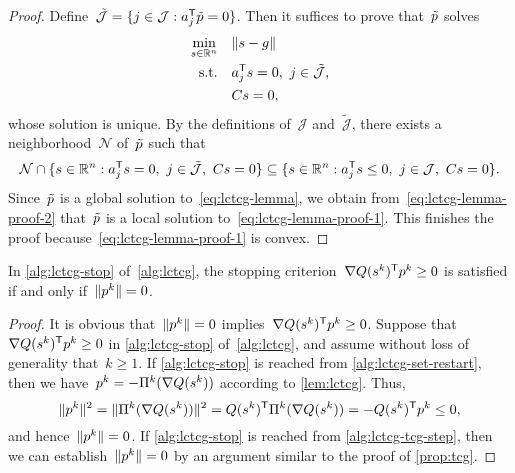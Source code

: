 \begin{proof}
    Define~$\tilde{\mathcal{J}} = \set{j \in \mathcal{J} : a_j^{\T} \tilde{\pstep} = 0}$.
    Then it suffices to prove that~$\tilde{\pstep}$ solves
    \begin{subequations}
        \label{eq:lctcg-lemma-proof-1}
        \begin{align}
            \min_{\sstep \in \R^n}  & \quad \norm{\sstep - g}\\
            \text{s.t.}             & \quad a_j^{\T} \sstep = 0, ~ j \in \tilde{\mathcal{J}},\\
                                    & \quad C \sstep = 0,
        \end{align}
    \end{subequations}
    whose solution is unique.
    By the definitions of~$\mathcal{J}$ and~$\tilde{\mathcal{J}}$, there exists a neighborhood~$\mathcal{N}$ of~$\tilde{\pstep}$ such that
    \begin{equation}
        \label{eq:lctcg-lemma-proof-2}
        \mathcal{N} \cap \set{\sstep \in \R^n : a_j^{\T} \sstep = 0, ~ j \in \tilde{\mathcal{J}}, ~ C \sstep = 0} \subseteq \set{\sstep \in \R^n : a_j^{\T} \sstep \le 0, ~ j \in \mathcal{J}, ~ C \sstep = 0}.
    \end{equation}
    Since~$\tilde{\pstep}$ is a global solution to~\cref{eq:lctcg-lemma}, we obtain from~\cref{eq:lctcg-lemma-proof-2} that~$\tilde{\pstep}$ is a local solution to~\cref{eq:lctcg-lemma-proof-1}.
    This finishes the proof because~\cref{eq:lctcg-lemma-proof-1} is convex.
\end{proof}


\begin{proposition}
    \label{prop:lctcg}
    In \cref{alg:lctcg-stop} of~\cref{alg:lctcg}, the stopping criterion~$\nabla Q (\sstep[k])^{\T} \pstep[k] \ge 0$ is satisfied if and only if~$\norm{\pstep[k]} = 0$.
\end{proposition}

\begin{proof}
    It is obvious that~$\norm{\pstep[k]} = 0$ implies~$\nabla Q (\sstep[k])^{\T} \pstep[k] \ge 0$.
    Suppose that~$\nabla Q (\sstep[k])^{\T} \pstep[k] \ge 0$ in \cref{alg:lctcg-stop} of~\cref{alg:lctcg}, and assume without loss of generality that~$k \ge 1$.
    If \cref{alg:lctcg-stop} is reached from \cref{alg:lctcg-set-restart}, then we have~$\pstep[k] = -\Pi^k(\nabla Q(\sstep[k]))$ according to \cref{lem:lctcg}.
    Thus,
    \begin{equation*}
        \norm{\pstep[k]}^2 = \norm{\Pi^k(\nabla Q(\sstep[k]))}^2 = Q (\sstep[k])^{\T}  \Pi^k(\nabla Q(\sstep[k])) = - Q (\sstep[k])^{\T}  \pstep[k] \le 0,
    \end{equation*}
    and hence~$\norm{\pstep[k]} = 0$.
    If \cref{alg:lctcg-stop} is reached from \cref{alg:lctcg-tcg-step}, then we can establish~$\norm{\pstep[k]} = 0$ by an argument similar to the proof of \cref{prop:tcg}.
\end{proof}

